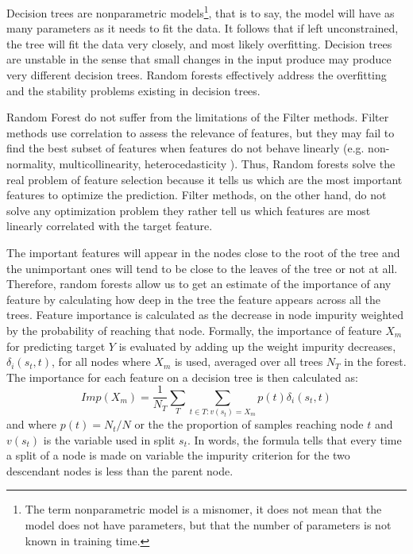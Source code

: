 \documentclass[preprint,12pt]{elsarticle}
\begin{document}
Decision trees are nonparametric models\footnote{The term nonparametric model is a misnomer, it does not mean that the model does not have parameters, but that the number of parameters is not known in training time.}, that is to say, the model will have as many parameters as it needs to fit the data. It follows that if left unconstrained, the tree will fit the data very closely, and most likely overfitting. Decision trees are unstable in the sense that small changes in the input produce may produce very different decision trees.
Random forests effectively address the overfitting and the stability problems existing in decision trees.

Random Forest do not suffer from the limitations of the Filter methods. Filter methods use correlation to assess the relevance of features, but they may fail to find the best subset of features when features do not behave linearly (e.g. non-normality, multicollinearity, heterocedasticity \cite{ratkowsky1990handbook}). Thus, Random forests solve the real problem of feature selection because it tells us which are the most important features to optimize the prediction. Filter methods, on the other hand, do not solve any optimization problem they rather tell us which features are most linearly correlated with the target feature. 

The important features will appear in the nodes close to the root of the tree and the unimportant ones will tend to be close to the leaves of the tree or not at all. Therefore, random forests allow us to get an estimate of the importance of any feature by calculating how deep in the tree the feature appears across all the trees. 
Feature importance is calculated as the decrease in node impurity weighted by the probability of reaching that node. Formally, the importance of feature $X_m$ for predicting target $Y$ is evaluated by adding up the weight impurity decreases,$\delta_i(s_t,t)$, for all nodes where $X_m$ is used, averaged over all trees $N_T$ in the forest.
The importance for each feature on a decision tree is then calculated as:
\begin{equation}
Imp(X_m) = \frac{1}{N_T} \sum_{T} \sum_{t \in T:v(s_{t})=X_{m}} p(t) \delta_i(s_t,t)
\label{eq:gini}
\end{equation}
and where $p(t)= N_t/N$ or the the proportion of samples reaching node $t$ and $v(s_t)$ is the variable used in split $s_t$. In words, the formula tells that every time a split of a node is made on variable the  impurity criterion for the two descendant nodes is less than the parent node. 
\end{document}
